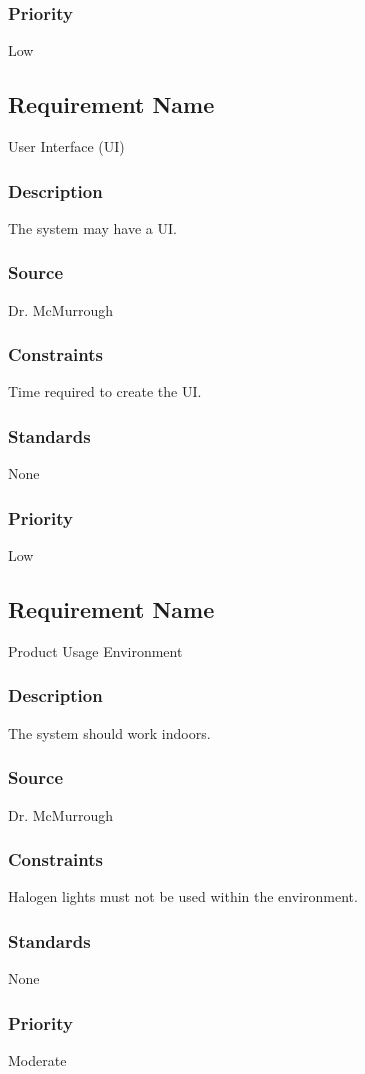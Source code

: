 \subsubsection{Priority}
Low

\subsection{Requirement Name}
User Interface (UI)
\subsubsection{Description}
The system may have a UI.
\subsubsection{Source}
Dr. McMurrough
\subsubsection{Constraints}
Time required to create the UI.
\subsubsection{Standards}
None
\subsubsection{Priority}
Low

\subsection{Requirement Name}
Product Usage Environment
\subsubsection{Description}
The system should work indoors.
\subsubsection{Source}
Dr. McMurrough
\subsubsection{Constraints}
Halogen lights must not be used within the environment.
\subsubsection{Standards}
None
\subsubsection{Priority}
Moderate

